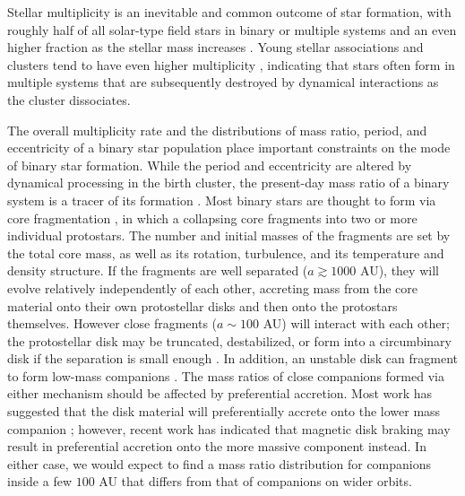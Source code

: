 \documentclass{emulateapj}
\begin{document}
\label{sec:intro}

Stellar multiplicity is an inevitable and common outcome of star formation, with roughly half of all solar-type field stars in binary or multiple systems \citep{Raghavan2010} and an even higher fraction as the stellar mass increases \citep{Zinnecker2007}. Young stellar associations and clusters tend to have even higher multiplicity \citep{Duchene2013}, indicating that stars often form in multiple systems that are subsequently destroyed by dynamical interactions as the cluster dissociates. 

The overall multiplicity rate and the distributions of mass ratio, period, and eccentricity of a binary star population place important constraints on the mode of binary star formation. While the period and eccentricity are altered by dynamical processing in the birth cluster, the present-day mass ratio of a binary system is a tracer of its formation \citep{Parker2013}. Most binary stars are thought to form via core fragmentation \citep{Boss1979, Boss1986, Bate1995}, in which a collapsing core fragments into two or more individual protostars. The number and initial masses of the fragments are set by the total core mass, as well as its rotation, turbulence, and its temperature and density structure. If the fragments are well separated ($a \gtrsim 1000$ AU), they will evolve relatively independently of each other, accreting mass from the core material onto their own protostellar disks and then onto the protostars themselves. However close fragments ($a \sim 100$ AU) will interact with each other; the protostellar disk may be truncated, destabilized, or form into a circumbinary disk if the separation is small enough \citep{Bate1997}. In addition, an unstable disk can fragment to form low-mass companions \citep{Kratter2006, Stamatellos2011}. The mass ratios of close companions formed via either mechanism should be affected by preferential accretion. Most work has suggested that the disk material will preferentially accrete onto the lower mass companion \citep{Bate1997, BBB2002}; however, recent work has indicated that magnetic disk braking may result in preferential accretion onto the more massive component \citep{Zhao2013} instead. In either case, we would expect to find a mass ratio distribution for companions inside a few $100$ AU that differs from that of companions on wider orbits.
\end{document}

